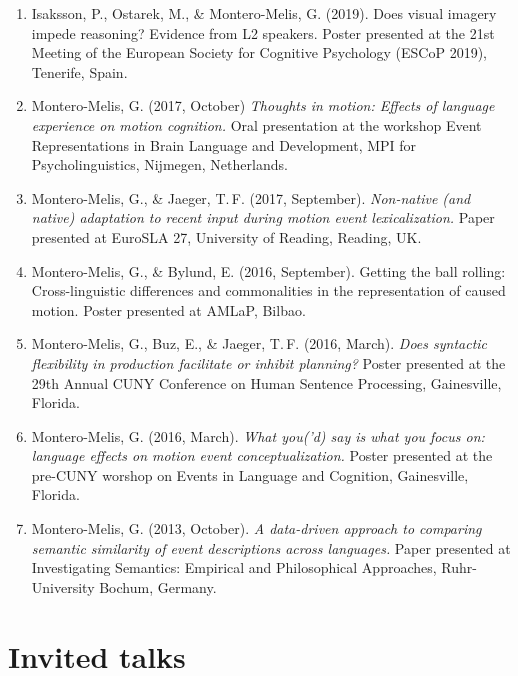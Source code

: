 \documentclass[margin, 11pt]{res} %
\begin{document}
\begin{resume}
\begin{enumerate}
\item Isaksson, P., Ostarek, M., \& Montero-Melis, G. (2019). Does visual imagery impede reasoning? Evidence from L2 speakers. Poster presented at the 21st Meeting of the European Society for Cognitive Psychology (ESCoP 2019), Tenerife, Spain.

\item Montero-Melis, G. (2017, October) \textit{Thoughts in motion: Effects of language experience on motion cognition.} Oral presentation at the workshop Event Representations in Brain Language and Development, MPI for Psycholinguistics, Nijmegen, Netherlands.

\item Montero-Melis, G., \& Jaeger, T.\,F. (2017, September). \textit{Non-native (and native) adaptation to recent input during motion event lexicalization.} Paper presented at EuroSLA 27, University of Reading, Reading, UK.

\item Montero-Melis, G., \& Bylund, E. (2016, September). Getting the ball rolling: Cross-linguistic differences and commonalities in the representation of caused motion. Poster presented at AMLaP, Bilbao.

\item Montero-Melis, G., Buz, E., \& Jaeger, T.\,F. (2016, March). \textit{Does syntactic flexibility in production facilitate or inhibit planning?} Poster presented at the 29th Annual CUNY Conference on Human Sentence Processing, Gainesville, Florida.

\item Montero-Melis, G. (2016, March). \textit{What you('d) say is what you focus on: language effects on motion event conceptualization.} Poster presented at the pre-CUNY worshop on Events in Language and Cognition, Gainesville, Florida.

\item Montero-Melis, G. (2013, October). \textit{A data-driven approach to comparing semantic similarity of event descriptions across languages.} Paper presented at Investigating Semantics: Empirical and Philosophical Approaches, Ruhr-University Bochum, Germany.

\end{enumerate}



\section{\sc Invited talks}


\end{resume}
\end{document}
